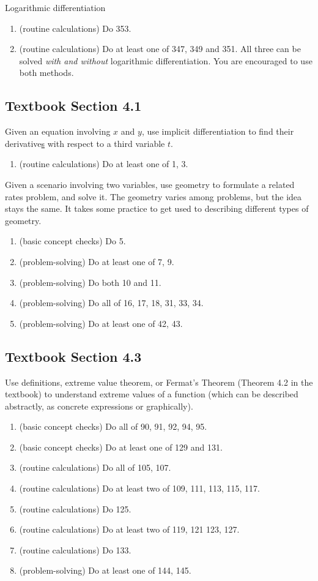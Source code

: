\documentclass[./main.tex]{subfiles}
\begin{document}
Logarithmic differentiation
\begin{enumerate}
  \item (routine calculations) Do 353.
  \item (routine calculations) Do at least one of 347, 349 and 351. All three can be solved \emph{with and without} logarithmic differentiation. You are encouraged to use both methods. 
\end{enumerate}

\subsection*{Textbook Section 4.1}

Given an equation involving \(x\) and \(y\), use implicit differentiation to find their derivative\underline{s} with respect to a third variable \(t\).
\begin{enumerate}
  \item (routine calculations) Do at least one of 1, 3.
\end{enumerate}

Given a scenario involving two variables, use geometry to formulate a related rates problem, and solve it.  The geometry varies among problems, but the idea stays the same. It takes some practice to get used to describing different types of geometry. 
\begin{enumerate}
  \item (basic concept checks) Do 5. 
  \item (problem-solving) Do at least one of 7, 9.
  \item (problem-solving) Do both 10 and 11.
  \item (problem-solving) Do all of 16, 17, 18, 31, 33, 34.
  \item (problem-solving) Do at least one of 42, 43.
\end{enumerate}
\clearpage

\subsection*{Textbook Section 4.3}

Use definitions, extreme value theorem, or Fermat's Theorem (Theorem 4.2 in the textbook) to understand extreme values of a function (which can be described abstractly, as concrete expressions or graphically).
\begin{enumerate}
  \item (basic concept checks) Do all of 90, 91, 92, 94, 95.
  \item (basic concept checks) Do at least one of 129 and 131.
  \item (routine calculations) Do all of 105, 107.
  \item (routine calculations) Do at least two of 109, 111, 113, 115, 117.
  \item (routine calculations) Do 125.
  \item (routine calculations) Do at least two of 119, 121 123, 127.
  \item (routine calculations) Do 133.
  \item (problem-solving) Do at least one of 144, 145.
\end{enumerate}
\end{document}

